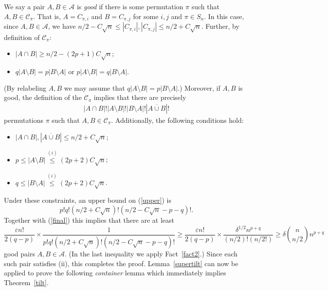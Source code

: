 \documentclass[11pt]{article}
\numberwithin{equation}{section}
\def\eps{\varepsilon}
\def\COMMENT#1{}
\begin{document}
We say a pair $A,B \in \mathcal A$ is \emph{good} if there is some permutation $\pi$ such that $A,B \in \mathcal C _\pi$. 
That is, $A=C_{\pi,i}$ and $B=C_{\pi,j}$ for some $i,j$ and $\pi \in S_n$. 
In this case, since $A,B \in \mathcal A$, we have $n/2 -C \sqrt{n}\leq |C_{\pi,i}|,| C_{\pi,j}|\leq n/2 +C \sqrt{n}$.
Further, by definition of $\mathcal C_\pi$:
\begin{itemize}
\item[(i)] $|A \cap B| \geq n/2 -(2p+1)C \sqrt{n};$
\item[(ii)]  $q|A\setminus B|=p|B\setminus A|$ or $p|A\setminus B|=q|B\setminus A|$.
\end{itemize}
(By relabeling $A,B$ we may assume that $q|A\setminus B|=p|B\setminus A|$.)\COMMENT{relabeling used implicitly later on}
Moreover, if $A,B$ is good, the definition of the $\mathcal C_\pi$ implies that there are precisely
\begin{align}\label{upper}
|A\cap B|!|A\setminus B|!|B\setminus A|!|\overline{ A\cup B}|!
\end{align}
permutations $\pi$ such that $A,B \in \mathcal C _\pi$. 
Additionally, the following conditions hold:
\begin{itemize}
\item $|A \cap B|, |\overline{A\cup B}| \leq n/2+C\sqrt{n}$;
\item $p\leq |A\setminus B| \stackrel{(i)}{\leq} (2p+2)C \sqrt{n}$;
\item $q \leq |B\setminus A|\stackrel{(i)}{\leq} (2p+2)C \sqrt{n} $.
\end{itemize}
Under these constraints, an upper bound on (\ref{upper}) is
$$p!q!(n/2+C\sqrt{n})!(n/2-C\sqrt{n}-p-q)!.$$
Together with (\ref{final}) this implies that there are at least
$$\frac{\eps n!}{2(q-p)} \times \frac{1}{p!q!(n/2+C\sqrt{n})!(n/2-C\sqrt{n}-p-q)!} \geq \frac{\eps n!}{2(q-p)} \times \frac{\delta ^{1/2} n^{p+q}}{(n/2)!(n/2!)}\geq \delta \binom{n}{n/2} n^{p+q}$$
good pairs $A,B \in \mathcal A$. (In the last inequality we apply Fact~\ref{fact2}.) Since each such pair satisfies (ii), this completes the proof.
\endproof
Lemma~\ref{supertilt} can now be applied to prove the following \emph{container} lemma  which immediately implies Theorem~\ref{tilt}.
\end{document}
